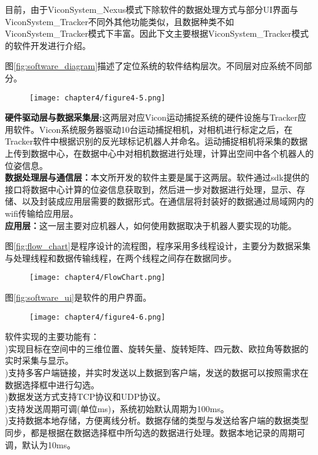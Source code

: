 目前，由于ViconSystem\_Nexus模式下除软件的数据处理方式与部分UI界面与ViconSystem\_Tracker不同外其他功能类似，且数据种类不如ViconSystem\_Tracker模式下丰富。因此下文主要根据ViconSystem\_Tracker模式的软件开发进行介绍。

图\ref{fig:software_diagram}描述了定位系统的软件结构层次。不同层对应系统不同部分。
\begin{figure}[!htbp]
	\centering
	\texttt{[image: chapter4/figure4-5.png]}
\end{figure}

\indent \textbf{硬件驱动层与数据采集层:}这两层对应Vicon运动捕捉系统的硬件设施与Tracker应用软件。Vicon系统服务器驱动10台运动捕捉相机，对相机进行标定之后，在Tracker软件中根据识别的反光球标记机器人并命名。运动捕捉相机将采集的数据上传到数据中心，在数据中心中对相机数据进行处理，计算出空间中各个机器人的位姿信息。\\
\indent \textbf{数据处理层与通信层：}本文所开发的软件主要是属于这两层。软件通过sdk提供的接口将数据中心计算的位姿信息获取到，然后进一步对数据进行处理，显示、存储、以及封装成应用层需要的数据形式。在通信层将封装好的数据通过局域网内的wifi传输给应用层。\\
\indent \textbf{应用层：}这一层主要对应机器人，如何使用数据取决于机器人要实现的功能。

图\ref{fig:flow_chart}是程序设计的流程图，程序采用多线程设计，主要分为数据采集与处理线程和数据传输线程，在两个线程之间存在数据同步。
\begin{figure}[!htbp]
	\centering
	\texttt{[image: chapter4/FlowChart.png]}
\end{figure}

图\ref{fig:software_ui}是软件的用户界面。
\begin{figure}[!htbp]
	\centering
	\texttt{[image: chapter4/figure4-6.png]}
\end{figure}

软件实现的主要功能有：\\
)实现目标在空间中的三维位置、旋转矢量、旋转矩阵、四元数、欧拉角等数据的实时采集与显示。\\
)支持多客户端链接，并实时发送以上数据到客户端，发送的数据可以按照需求在数据选择框中进行勾选。\\
)数据发送方式支持TCP协议和UDP协议。\\
)支持发送周期可调(单位ms)，系统初始默认周期为100ms。\\
)支持数据本地存储，方便离线分析。数据存储的类型与发送给客户端的数据类型同步，都是根据在数据选择框中所勾选的数据进行处理。数据本地记录的周期可调，默认为10ms。

